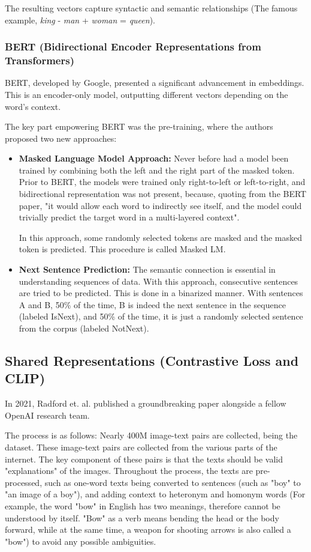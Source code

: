 \documentclass{article}
\begin{document}
The resulting vectors capture syntactic and semantic relationships (The famous example, \textit{king} - \textit{man} + \textit{woman} = \textit{queen}).

\subsubsection{BERT (Bidirectional Encoder Representations from Transformers)}
BERT, developed by Google, presented a significant advancement in embeddings. This is an encoder-only model, outputting different vectors depending on the word's context.

The key part empowering BERT was the pre-training, where the authors proposed two new approaches:
\begin{itemize}
    
    \item \textbf{Masked Language Model Approach:} Never before had a model been trained by combining both the left and the right part of the masked token. Prior to BERT, the models were trained only right-to-left or left-to-right, and bidirectional representation was not present, because, quoting from the BERT paper, "it would allow each word to indirectly see itself, and the model could trivially predict the target word in a multi-layered context".

    In this approach, some randomly selected tokens are masked and the masked token is predicted. This procedure is called Masked LM.

    \item \textbf{Next Sentence Prediction:} The semantic connection is essential in understanding sequences of data. With this approach, consecutive sentences are tried to be predicted. This is done in a binarized manner. With sentences A and B, 50\% of the time, B is indeed the next sentence in the sequence (labeled IsNext), and 50\% of the time, it is just a randomly selected sentence from the corpus (labeled NotNext).
    
\end{itemize}

\subsection{Shared Representations (Contrastive Loss and CLIP)}

In 2021, Radford et. al. published a groundbreaking paper alongside a fellow OpenAI research team. 

The process is as follows: Nearly 400M image-text pairs are collected, being the dataset. These image-text pairs are collected from the various parts of the internet. The key component of these pairs is that the texts should be valid "explanations" of the images. Throughout the process, the texts are pre-processed, such as one-word texts being converted to sentences (such as "boy" to "an image of a boy"), and adding context to heteronym and homonym words (For example, the word "bow" in English has two meanings, therefore cannot be understood by itself. "Bow" as a verb means bending the head or the body forward, while at the same time, a weapon for shooting arrows is also called a "bow") to avoid any possible ambiguities.
\end{document}
